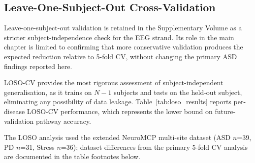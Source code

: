 
\subsection{Leave-One-Subject-Out Cross-Validation}

Leave-one-subject-out validation is retained in the Supplementary Volume as a stricter subject-independence check for the EEG strand. Its role in the main chapter is limited to confirming that more conservative validation produces the expected reduction relative to 5-fold CV, without changing the primary ASD findings reported here.

\iffalse
LOSO-CV provides the most rigorous assessment of subject-independent generalisation, as it trains on $N-1$ subjects and tests on the held-out subject, eliminating any possibility of data leakage. Table~\ref{tab:loso_results} reports per-disease LOSO-CV performance, which represents the lower bound on future-validation pathway accuracy.

The LOSO analysis used the extended NeuroMCP multi-site dataset (ASD $n$=39, PD $n$=31, Stress $n$=36); dataset differences from the primary 5-fold CV analysis are documented in the table footnotes below.

